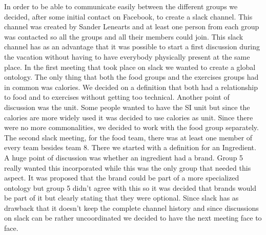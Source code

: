 In order to be able to communicate easily between the different groups we decided, after some initial contact on Facebook, to create a slack channel. This channel was created by Sander Lenearts and at least one person from each group was contacted so all the groups and all their members could join. This slack channel has as an advantage that it was possible to start a first discussion during the vacation without having to have everybody physically present at the same place. 
\newline
\newline
\noindent
In the first meeting that took place on slack we wanted to create a global ontology. The only thing that both the food groups and the exercises groups had in common was calories. We decided on a definition that both had a relationship to food and to exercises without getting too technical. Another point of discussion was the unit. Some people wanted to have the SI unit but since the calories are more widely used it was decided to use calories as unit. Since there were no more commonalities, we decided to work with the food group separately. 
\newline
\newline
\noindent
The second slack meeting, for the food team, there was at least one member of every team besides team 8. There we started with a definition for an Ingredient. A huge point of discussion was whether an ingredient had a brand. Group 5 really wanted this incorporated while this was the only group that needed this aspect. It was proposed that the brand could be part of a more specialized ontology but group 5 didn't agree with this so it was decided that brands would be part of it but clearly stating that they were optional. Since slack has as drawback that it doesn't keep the complete channel history and since discussions on slack can be rather uncoordinated we decided to have the next meeting face to face. 
\newline
\newline
\noindent
